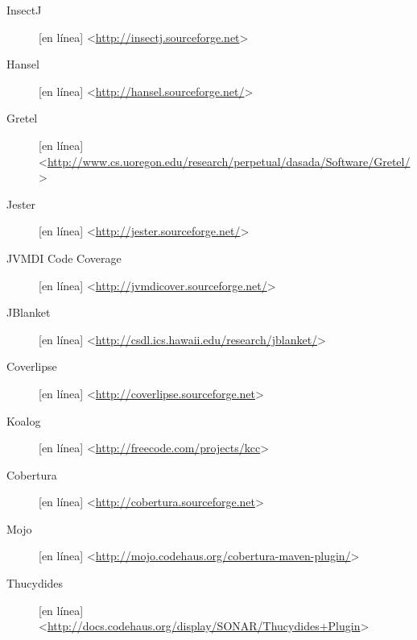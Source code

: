 \begin{description}
\item[InsectJ] [en línea] \textless\url{http://insectj.sourceforge.net}\textgreater  \\
\item[Hansel] [en línea] \textless\url{http://hansel.sourceforge.net/}\textgreater  \\
\item[Gretel] [en línea] \textless\url{http://www.cs.uoregon.edu/research/perpetual/dasada/Software/Gretel/}\textgreater  \\
\item[Jester] [en línea] \textless\url{http://jester.sourceforge.net/}\textgreater  \\
\item[JVMDI Code Coverage] [en línea] \textless\url{http://jvmdicover.sourceforge.net/}\textgreater  \\
\item[JBlanket] [en línea] \textless\url{http://csdl.ics.hawaii.edu/research/jblanket/}\textgreater  \\
\item[Coverlipse] [en línea] \textless\url{http://coverlipse.sourceforge.net}\textgreater  \\
\item[Koalog] [en línea] \textless\url{http://freecode.com/projects/kcc}\textgreater  \\
\item[Cobertura] [en línea] \textless\url{http://cobertura.sourceforge.net}\textgreater  \\
\item[Mojo] [en línea] \textless\url{http://mojo.codehaus.org/cobertura-maven-plugin/}\textgreater  \\
\item[Thucydides] [en línea] \textless\url{http://docs.codehaus.org/display/SONAR/Thucydides+Plugin}\textgreater  
\end{description}